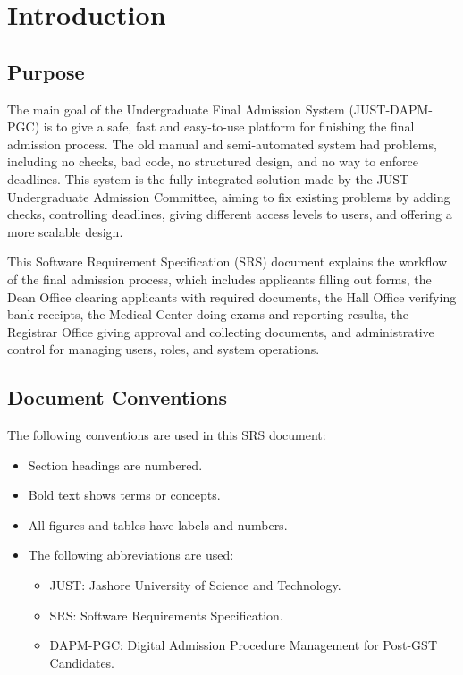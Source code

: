 \section{Introduction}

\subsection{Purpose}

The main goal of the Undergraduate Final Admission System (JUST-DAPM-PGC) is to give a safe, fast and easy-to-use platform for finishing the final admission process. The old manual and semi-automated system had problems, including no checks, bad code, no structured design, and no way to enforce deadlines. This system is the fully integrated solution made by the JUST Undergraduate Admission Committee, aiming to fix existing problems by adding checks, controlling deadlines, giving different access levels to users, and offering a more scalable design.

This Software Requirement Specification (SRS) document explains the workflow of the final admission process, which includes applicants filling out forms, the Dean Office clearing applicants with required documents, the Hall Office verifying bank receipts, the Medical Center doing exams and reporting results, the Registrar Office giving approval and collecting documents, and administrative control for managing users, roles, and system operations.

\subsection{Document Conventions}

The following conventions are used in this SRS document:

\begin{itemize}
    \item Section headings are numbered.
    \item {Bold text} shows terms or concepts.
    \item All figures and tables have labels and numbers.
    \item The following abbreviations are used:
    \begin{itemize}
        \item JUST: Jashore University of Science and Technology.
        \item SRS: Software Requirements Specification.
        \item DAPM-PGC: Digital Admission Procedure Management for Post-GST Candidates.
    \end{itemize}
\end{itemize}

